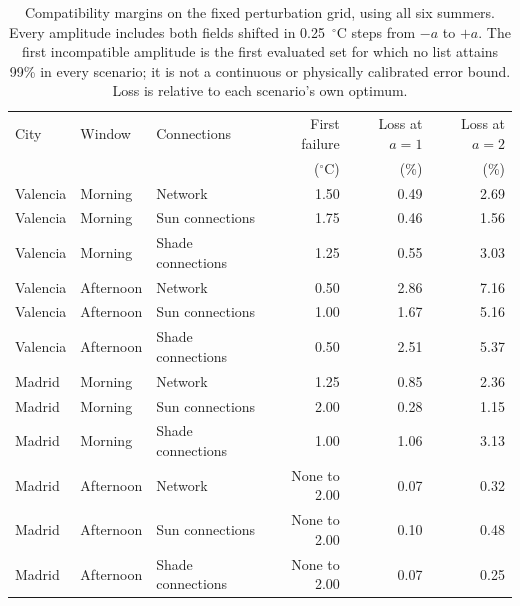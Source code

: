 \begin{table}[htbp]\centering\small
\caption{Compatibility margins on the fixed perturbation grid, using all six summers. Every amplitude includes both fields shifted in 0.25~$^\circ$C steps from $-a$ to $+a$. The first incompatible amplitude is the first evaluated set for which no list attains 99\% in every scenario; it is not a continuous or physically calibrated error bound. Loss is relative to each scenario's own optimum.}\label{tab:fixed}
\begin{tabular}{lllrrr}\toprule
City & Window & Connections & First failure & Loss at $a=1$ & Loss at $a=2$\\
 & & & ($^\circ$C) & (\%) & (\%)\\\midrule
Valencia & Morning & Network & 1.50 & 0.49 & 2.69\\
Valencia & Morning & Sun connections & 1.75 & 0.46 & 1.56\\
Valencia & Morning & Shade connections & 1.25 & 0.55 & 3.03\\
Valencia & Afternoon & Network & 0.50 & 2.86 & 7.16\\
Valencia & Afternoon & Sun connections & 1.00 & 1.67 & 5.16\\
Valencia & Afternoon & Shade connections & 0.50 & 2.51 & 5.37\\
Madrid & Morning & Network & 1.25 & 0.85 & 2.36\\
Madrid & Morning & Sun connections & 2.00 & 0.28 & 1.15\\
Madrid & Morning & Shade connections & 1.00 & 1.06 & 3.13\\
Madrid & Afternoon & Network & None to 2.00 & 0.07 & 0.32\\
Madrid & Afternoon & Sun connections & None to 2.00 & 0.10 & 0.48\\
Madrid & Afternoon & Shade connections & None to 2.00 & 0.07 & 0.25\\
\bottomrule\end{tabular}\end{table}

